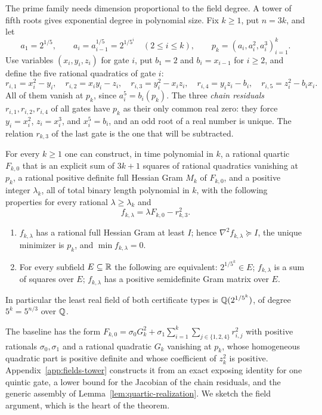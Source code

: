 The prime family needs dimension proportional to the field degree. A tower of
fifth roots gives exponential degree in polynomial size. Fix $k\ge1$, put
$n=3k$, and let
\[
 a_1=2^{1/5},\qquad a_i=a_{i-1}^{1/5}=2^{1/5^i}\quad(2\le i\le k),\qquad
 p_k=(a_i,a_i^2,a_i^3)_{i=1}^k .
\]
Use variables $(x_i,y_i,z_i)$ for gate $i$, put $b_1=2$ and $b_i=x_{i-1}$
for $i\ge2$, and define the five rational quadratics of gate $i$:
\begin{equation}
 r_{i,1}=x_i^2-y_i,\quad r_{i,2}=x_iy_i-z_i,\quad
 r_{i,3}=y_i^2-x_iz_i,\quad r_{i,4}=y_iz_i-b_i,\quad
 r_{i,5}=z_i^2-b_ix_i .
 \label{eq:fields-tower-relations}
\end{equation}
All of them vanish at $p_k$, since $a_i^5=b_i(p_k)$. The three \emph{chain
residuals} $r_{i,1},r_{i,2},r_{i,4}$ of all gates have $p_k$ as their only
common real zero: they force $y_i=x_i^2$, $z_i=x_i^3$, and $x_i^5=b_i$, and
an odd root of a real number is unique. The relation $r_{k,3}$ of the last
gate is the one that will be subtracted.

\begin{theorem}
\label{thm:fields-tower}
For every $k\ge1$ one can construct, in time polynomial in $k$, a rational
quartic $F_{k,0}$ that is an explicit sum of $3k+1$ squares of rational
quadratics vanishing at $p_k$, a rational positive definite full Hessian Gram
$M_k$ of $F_{k,0}$, and a positive integer $\lambda_k$, all of total binary
length polynomial in $k$, with the following properties for every rational
$\lambda\ge\lambda_k$ and
\[
 f_{k,\lambda}=\lambda F_{k,0}-r_{k,3}^2 .
\]
\begin{enumerate}[label=(\alph*)]
\item $f_{k,\lambda}$ has a rational full Hessian Gram at least $I$; hence
  $\nabla^2f_{k,\lambda}\succeq I$, the unique minimizer is $p_k$, and
  $\min f_{k,\lambda}=0$.
\item For every subfield $E\subseteq\mathbb R$ the following are equivalent:
  $2^{1/5^k}\in E$; $f_{k,\lambda}$ is a sum of squares over $E$;
  $f_{k,\lambda}$ has a positive semidefinite Gram matrix over $E$.
\end{enumerate}
In particular the least real field of both certificate types is
$\mathbb Q(2^{1/5^k})$, of degree $5^k=5^{n/3}$ over $\mathbb Q$.
\end{theorem}

The baseline has the form
$F_{k,0}=\sigma_0G_k^2+\sigma_1\sum_{i=1}^k\sum_{j\in\{1,2,4\}}r_{i,j}^2$
with positive rationals $\sigma_0,\sigma_1$ and a rational quadratic $G_k$
vanishing at $p_k$, whose homogeneous quadratic part is positive definite and
whose coefficient of $z_k^2$ is positive. Appendix~\ref{app:fields-tower}
constructs it from an exact exposing identity for one quintic gate, a lower
bound for the Jacobian of the chain residuals, and the generic assembly of
Lemma~\ref{lem:quartic-realization}. We sketch the field argument, which is
the heart of the theorem.

